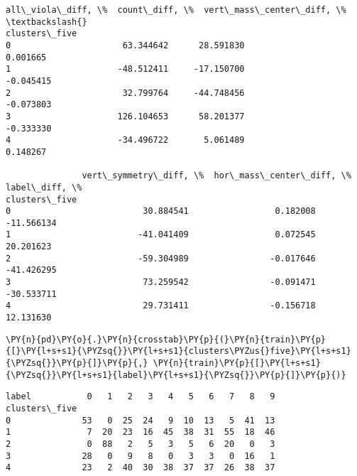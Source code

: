             \begin{tcolorbox}[breakable, size=fbox, boxrule=.5pt, pad at break*=1mm, opacityfill=0]
\begin{Verbatim}[commandchars=\\\{\}]
               all\_viola\_diff, \%  count\_diff, \%  vert\_mass\_center\_diff, \%  \textbackslash{}
clusters\_five
0                      63.344642      28.591830                  0.001665
1                     -48.512411     -17.150700                 -0.045415
2                      32.799764     -44.748456                 -0.073803
3                     126.104653      58.201377                 -0.333330
4                     -34.496722       5.061489                  0.148267

               vert\_symmetry\_diff, \%  hor\_mass\_center\_diff, \%  label\_diff, \%
clusters\_five
0                          30.884541                 0.182008     -11.566134
1                         -41.041409                 0.072545      20.201623
2                         -59.304989                -0.017646     -41.426295
3                          73.259542                -0.091471     -30.533711
4                          29.731411                -0.156718      12.131630
\end{Verbatim}
\end{tcolorbox}
        
    \begin{tcolorbox}[breakable, size=fbox, boxrule=1pt, pad at break*=1mm,colback=cellbackground, colframe=cellborder]
\begin{Verbatim}[commandchars=\\\{\}]
\PY{n}{pd}\PY{o}{.}\PY{n}{crosstab}\PY{p}{(}\PY{n}{train}\PY{p}{[}\PY{l+s+s1}{\PYZsq{}}\PY{l+s+s1}{clusters\PYZus{}five}\PY{l+s+s1}{\PYZsq{}}\PY{p}{]}\PY{p}{,} \PY{n}{train}\PY{p}{[}\PY{l+s+s1}{\PYZsq{}}\PY{l+s+s1}{label}\PY{l+s+s1}{\PYZsq{}}\PY{p}{]}\PY{p}{)}
\end{Verbatim}
\end{tcolorbox}

            \begin{tcolorbox}[breakable, size=fbox, boxrule=.5pt, pad at break*=1mm, opacityfill=0]
\begin{Verbatim}[commandchars=\\\{\}]
label           0   1   2   3   4   5   6   7   8   9
clusters\_five
0              53   0  25  24   9  10  13   5  41  13
1               7  20  23  16  45  38  31  55  18  46
2               0  88   2   5   3   5   6  20   0   3
3              28   0   9   8   0   3   3   0  16   1
4              23   2  40  30  38  37  37  26  38  37
\end{Verbatim}
\end{tcolorbox}
        

